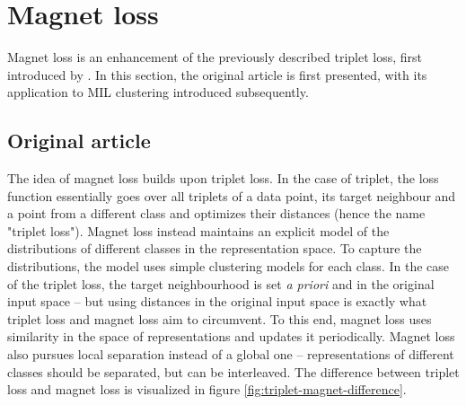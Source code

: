 \section{Magnet loss}
Magnet loss is an enhancement of the previously described triplet loss, first introduced by \cite{rippel_metric_2015}. In this section, the original article is first presented, with its application to MIL clustering introduced subsequently.

\subsection{Original article}
The idea of magnet loss builds upon triplet loss. In the case of triplet, the loss function essentially goes over all triplets of a data point, its target neighbour and a point from a different class and optimizes their distances (hence the name "triplet loss"). Magnet loss instead maintains an explicit model of the distributions of different classes in the representation space. To capture the distributions, the model uses simple clustering models for each class. In the case of the triplet loss, the target neighbourhood is set \textit{a priori} and in the original input space -- but using distances in the original input space is exactly what triplet loss and magnet loss aim to circumvent. To this end, magnet loss uses similarity in the space of representations and updates it periodically. Magnet loss also pursues local separation instead of a global one -- representations of different classes should be separated, but can be interleaved. The difference between triplet loss and magnet loss is visualized in figure \ref{fig:triplet-magnet-difference}.


